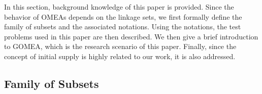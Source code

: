 \documentclass{sig-alternate}
\begin{document}
In this section, background knowledge of this paper is provided.
Since the behavior of OMEAs depends on the linkage sets,
we first formally define the family of subsets and the associated notations.
Using the notations, the test problems used in this paper are then described.
We then give a brief introduction to GOMEA, which is the research scenario of this paper.
Finally, since the concept of initial supply is highly related to our work, it is also addressed.

%



\subsection{Family of Subsets}
\end{document}
